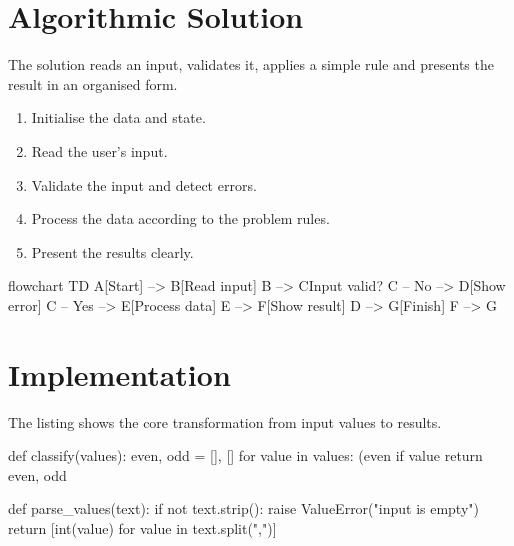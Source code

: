 \documentclass[12pt]{article}
\newcommand{\lblSteps}{Algorithm Steps}
\renewcommand{\lblSteps}{Pasos del algoritmo}}
\begin{document}
  \section{Algorithmic Solution}
  The solution reads an input, validates it, applies a simple rule and
  presents the result in an organised form.

  \begin{tcolorbox}[colback=workshopaccent!3,colframe=workshopaccent!35,coltitle=workshopink,
      title={\lblSteps},boxrule=0.5pt,arc=1mm]
    \begin{enumerate}
      \item Initialise the data and state.
      \item Read the user's input.
      \item Validate the input and detect errors.
      \item Process the data according to the problem rules.
      \item Present the results clearly.
    \end{enumerate}
  \end{tcolorbox}

  \begin{mermaid}[style=editorial,width=0.4\linewidth,
      caption={Algorithm workflow},pos=t]
    flowchart TD
    A[Start] --> B[Read input]
    B --> C{Input valid?}
    C -- No --> D[Show error]
    C -- Yes --> E[Process data]
    E --> F[Show result]
    D --> G[Finish]
    F --> G
  \end{mermaid}

  \section{Implementation}
  The listing shows the core transformation from input values to results.

  \begin{code}[lang=python,numbers=true]
def classify(values):
    even, odd = [], []
    for value in values:
        (even if value %
    return even, odd

def parse_values(text):
    if not text.strip():
        raise ValueError("input is empty")
    return [int(value) for value in text.split(",")]
  \end{code}
\end{document}
